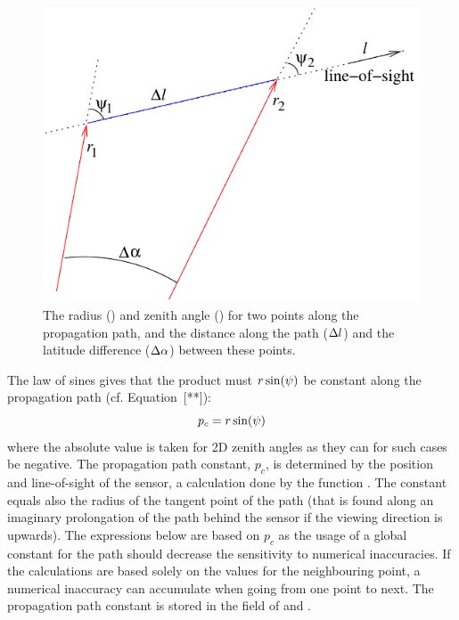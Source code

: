 \begin{figure}[!t]
 \begin{center}
  \begin{minipage}[c]{0.65\textwidth}
   \begin{center}
    \includegraphics*[width=0.9\hsize]{Figs/ppath/geom1d}
   \end{center}
  \end{minipage}%
  \begin{minipage}[c]{0.35\textwidth}
   \caption{The radius (\Rds) and zenith angle (\ZntAng) for two points along
     the propagation path, and the distance along the path ($\Delta l$)
     and the latitude difference ($\Delta\alpha$) between these points.}
   \label{fig:ppath:1d2dgeom}
  \end{minipage}
 \end{center}
\end{figure}   

The law of sines gives that the product must $r\sin(\psi)$ be
constant along the propagation path (cf. Equation~[**]):
\begin{equation}
  p_c = r\sin(\psi)
  \label{eq:ppath:geomconst}
\end{equation}
where the absolute value is taken for 2D zenith angles as they can for
such cases be negative. The propagation path constant, $p_c$, is
determined by the position and line-of-sight of the sensor, a
calculation done by the function . The
constant equals also the radius of the tangent point of the path (that
is found along an imaginary prolongation of the path behind the sensor
if the viewing direction is upwards). The expressions below are based
on $p_c$ as the usage of a global constant for the path should
decrease the sensitivity to numerical inaccuracies. If the
calculations are based solely on the values for the neighbouring
point, a numerical inaccuracy can accumulate when going from one point
to next. The propagation path constant is stored in the field
 of  and .

